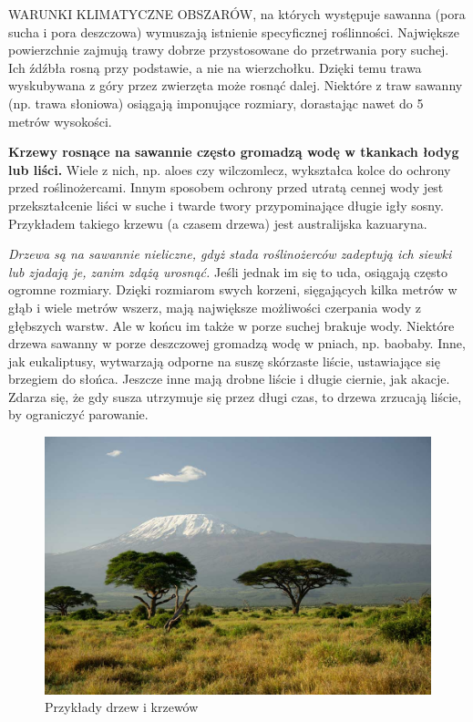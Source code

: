 \documentclass[14pt]{beamer}
\begin{document}
\begin{frame}{\color{black}{Roślinność}}

    \tiny   \uppercase{Warunki klimatyczne obszarów}, na których występuje sawanna (pora sucha i pora deszczowa) wymuszają istnienie specyficznej roślinności. Największe powierzchnie zajmują trawy dobrze przystosowane do przetrwania pory suchej. Ich źdźbła rosną przy podstawie, a nie na wierzchołku. Dzięki temu trawa wyskubywana z góry przez zwierzęta może rosnąć dalej. Niektóre z traw sawanny (np. trawa słoniowa) osiągają imponujące rozmiary, dorastając nawet do 5 metrów wysokości.

    \tiny  \textbf{Krzewy rosnące na sawannie często gromadzą wodę w tkankach łodyg lub liści.}  Wiele z nich, np. aloes czy wilczomlecz, wykształca kolce do ochrony przed roślinożercami. Innym sposobem ochrony przed utratą cennej wody jest przekształcenie liści w suche i twarde twory przypominające długie igły sosny. Przykładem takiego krzewu (a czasem drzewa) jest australijska kazuaryna.

    \tiny   \emph{Drzewa są na sawannie nieliczne, gdyż stada roślinożerców zadeptują ich siewki lub zjadają je, zanim zdążą urosnąć.} Jeśli jednak im się to uda, osiągają często ogromne rozmiary. Dzięki rozmiarom swych korzeni, sięgających kilka metrów w głąb i wiele metrów wszerz, mają największe możliwości czerpania wody z głębszych warstw. Ale w końcu im także w porze suchej brakuje wody. Niektóre drzewa sawanny w porze deszczowej gromadzą wodę w pniach, np. baobaby. Inne, jak eukaliptusy, wytwarzają odporne na suszę skórzaste liście, ustawiające się brzegiem do słońca. Jeszcze inne mają drobne liście i długie ciernie, jak akacje. Zdarza się, że gdy susza utrzymuje się przez długi czas, to drzewa zrzucają liście, by ograniczyć parowanie.

    
\end{frame}

\begin{frame}{\color{black}{Zdjęcia roślinności}}
    
    \begin{figure}
        \centering
        \includegraphics[scale = 0.25]{Sawanna1.jpg}
        \caption{Przykłady drzew i krzewów}
        \label{fig:my_label}
    \end{figure}
    
\end{frame}
\end{document}
